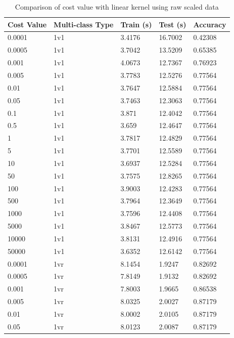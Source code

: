 \documentclass[a4paper, 10pt, conference]{ieeeconf}
\begin{document}
\begin{table}
\centering
\label{tbl:linear_params}
\caption{Comparison of cost value with linear kernel using raw scaled data}
\begin{tabular}{lllll}
Cost Value & Multi-class Type & Train (s) & Test (s) & Accuracy\\ \hline
0.0001 & 1v1 & 3.4176 & 16.7002 & 0.42308\\ \hline
0.0005 & 1v1 & 3.7042 & 13.5209 & 0.65385\\ \hline
0.001 & 1v1 & 4.0673 & 12.7367 & 0.76923\\ \hline
0.005 & 1v1 & 3.7783 & 12.5276 & 0.77564\\ \hline
0.01 & 1v1 & 3.7647 & 12.5884 & 0.77564\\ \hline
0.05 & 1v1 & 3.7463 & 12.3063 & 0.77564\\ \hline
0.1 & 1v1 & 3.871 & 12.4042 & 0.77564\\ \hline
0.5 & 1v1 & 3.659 & 12.4647 & 0.77564\\ \hline
1 & 1v1 & 3.7817 & 12.4829 & 0.77564\\ \hline
5 & 1v1 & 3.7701 & 12.5589 & 0.77564\\ \hline
10 & 1v1 & 3.6937 & 12.5284 & 0.77564\\ \hline
50 & 1v1 & 3.7575 & 12.8265 & 0.77564\\ \hline
100 & 1v1 & 3.9003 & 12.4283 & 0.77564\\ \hline
500 & 1v1 & 3.7964 & 12.3649 & 0.77564\\ \hline
1000 & 1v1 & 3.7596 & 12.4408 & 0.77564\\ \hline
5000 & 1v1 & 3.8467 & 12.5773 & 0.77564\\ \hline
10000 & 1v1 & 3.8131 & 12.4916 & 0.77564\\ \hline
50000 & 1v1 & 3.6352 & 12.6142 & 0.77564\\ \hline
0.0001 & 1vr & 8.1454 & 1.9247 & 0.82692\\ \hline
0.0005 & 1vr & 7.8149 & 1.9132 & 0.82692\\ \hline
0.001 & 1vr & 7.8003 & 1.9665 & 0.86538\\ \hline
0.005 & 1vr & 8.0325 & 2.0027 & 0.87179\\ \hline
0.01 & 1vr & 8.0002 & 2.0105 & 0.87179\\ \hline
0.05 & 1vr & 8.0123 & 2.0087 & 0.87179\\ \hline

\end{tabular}
\end{table}
\end{document}

